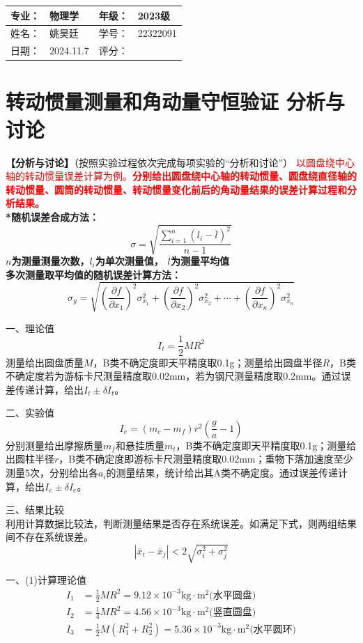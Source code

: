 \documentclass[dvipsnames, svgnames,a4paper,11pt]{article}
\begin{document}
\clearpage
{}
\begin{table}
	\renewcommand\arraystretch{1.7}
	\begin{tabularx}{\textwidth}{|X|X|X|X|}
	\hline
	专业：& 物理学 &年级：& 2023级\\
	\hline
	姓名： &姚昊廷 & 学号：& 22322091\\
	\hline
    日期：&2024.11.7 & 评分： &\\
	\hline
	\end{tabularx}
\end{table}

\section{转动惯量测量和角动量守恒验证 分析与讨论}
\textbf{【分析与讨论】}（按照实验过程依次完成每项实验的“分析和讨论”）
\textcolor{red}{以圆盘绕中心轴的转动惯量误差计算为例。\textbf{分别给出圆盘绕中心轴的转动惯量、圆盘绕直径轴的转动惯量、圆筒的转动惯量、转动惯量变化前后的角动量结果的误差计算过程和分析结果。}}\\
\textbf{*随机误差合成方法：}
$$\sigma=\sqrt{\frac{\displaystyle\sum_{i=1}^{n} (l_i-\overline{l})^2}{n-1}}$$
\textbf{$n$为测量测量次数，$l_i$为单次测量值， $\overline{l}$为测量平均值}\\
\textbf{多次测量取平均值的随机误差计算方法：}\\
$$\sigma_y=\sqrt{(\frac{\partial f}{\partial x_1})^2\sigma_{x_1}^2+(\frac{\partial f}{\partial x_2})^2\sigma_{x_2}^2+\cdots+(\frac{\partial f}{\partial x_n})^2\sigma_{x_n}^2}$$
{\color{red}一、理论值
$$I_t=\frac{1}{2}MR^2$$
测量给出圆盘质量$M$，B类不确定度即天平精度取0.1g；测量给出圆盘半径$R$，B类不确定度若为游标卡尺测量精度取0.02mm，若为钢尺测量精度取0.2mm。通过误差传递计算，给出$I_t\pm \delta I_t$。

二、实验值
$$I_e=(m_c-m_f)r^2(\frac{g}{a}-1)$$
分别测量给出摩擦质量$m_f$和悬挂质量$m_t$，B类不确定度即天平精度取0.1g；测量给出圆柱半径$r$，B类不确定度即游标卡尺测量精度取0.02mm；重物下落加速度至少测量5次，分别给出各$a_i$的测量结果，统计给出其A类不确定度。通过误差传递计算，给出$I_e\pm \delta I_e$。

三、结果比较\\
利用计算数据比较法，判断测量结果是否存在系统误差。如满足下式，则两组结果间不存在系统误差。
$$|\overline{x}_i-\overline{x}_j|<2\sqrt{\sigma_i^2+\sigma_j^2}$$
}
一、(1)计算理论值
\begin{align*}
	I_1&=\frac{1}{2}MR^2=9.12\times10^{-3}\text{kg}\cdot\text{m}^2\text{(水平圆盘)}\\
	I_2&=\frac{1}{4}MR^2=4.56\times10^{-3}\text{kg}\cdot\text{m}^2\text{(竖直圆盘)}\\
	I_3&=\frac{1}{2}M(R_1^2+R_2^2)=5.36\times10^{-3}\text{kg}\cdot\text{m}^2\text{(水平圆环)}\\
\end{align*}
\end{document}
